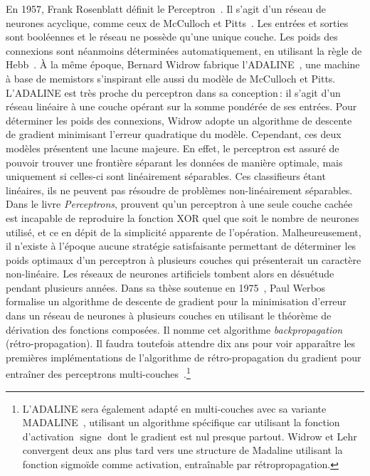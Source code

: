 En 1957, Frank Rosenblatt définit le Perceptron~\cite{rosenblatt_perceptron_1957}. Il s'agit d'un réseau de neurones acyclique, comme ceux de McCulloch et Pitts~\cite{mcculloch_logical_1943}. Les entrées et sorties sont booléennes et le réseau ne possède qu'une unique couche. Les poids des connexions sont néanmoins déterminées automatiquement, en utilisant la règle de Hebb~\cite{hebb_organization_1949}.
À la même époque, Bernard Widrow fabrique l'ADALINE~\cite{widrow_adaptive_1960}, une machine à base de memistors s'inspirant elle aussi du modèle de McCulloch et Pitts. L'ADALINE est très proche du perceptron dans sa conception\,: il s'agit d'un réseau linéaire à une couche opérant sur la somme pondérée de ses entrées. Pour déterminer les poids des connexions, Widrow adopte un algorithme de descente de gradient minimisant l'erreur quadratique du modèle.
Cependant, ces deux modèles présentent une lacune majeure. En effet, le perceptron est assuré de pouvoir trouver une frontière séparant les données de manière optimale, mais uniquement si celles-ci sont linéairement séparables. Ces classifieurs étant linéaires, ils ne peuvent pas résoudre de problèmes non-linéairement séparables. Dans le livre \emph{Perceptrons}, \citet{minsky_perceptrons_1969} prouvent qu'un perceptron à une seule couche cachée est incapable de reproduire la fonction XOR quel que soit le nombre de neurones utilisé, et ce en dépit de la simplicité apparente de l'opération. Malheureusement, il n'existe à l'époque aucune stratégie satisfaisante permettant de déterminer les poids optimaux d'un perceptron à plusieurs couches qui présenterait un caractère non-linéaire. Les réseaux de neurones artificiels tombent alors en désuétude pendant plusieurs années.
Dans sa thèse soutenue en 1975~\cite{werbos_beyond_1975}, Paul Werbos formalise un algorithme de descente de gradient pour la minimisation d'erreur dans un réseau de neurones à plusieurs couches en utilisant le théorème de dérivation des fonctions composées. Il nomme cet algorithme \emph{backpropagation} (rétro-propagation). Il faudra toutefois attendre dix ans pour voir apparaître les premières implémentations de l'algorithme de rétro-propagation du gradient pour entraîner des perceptrons multi-couches~\cite{rumelhart_learning_1986,lecun_learning_1986}.\footnote{L'ADALINE sera également adapté en multi-couches avec sa variante MADALINE~\cite{winter_madaline_1988}, utilisant un algorithme spécifique car utilisant la fonction d'activation $\operatorname{signe}$ dont le gradient est nul presque partout. Widrow et Lehr convergent deux ans plus tard vers une structure de Madaline utilisant la fonction sigmoïde comme activation, entraînable par rétropropagation.}

